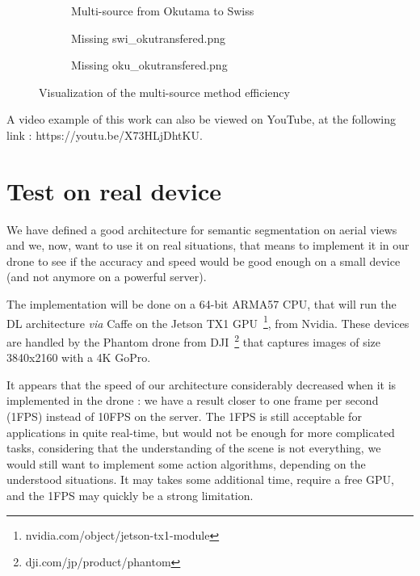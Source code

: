 \begin{figure}[ht!]
  \begin{subfigure}[c]{0.20\textwidth}
    \centering Multi-source from Okutama to Swiss
  \end{subfigure}
  \begin{subfigure}[c]{0.33\textwidth}
    \centering Missing swi\_okutransfered.png
  \end{subfigure}
  \begin{subfigure}[c]{0.45\textwidth}
    \centering Missing oku\_okutransfered.png
  \end{subfigure}
  \vspace{0.1cm}
  
  \caption{Visualization of the multi-source method efficiency}
  \label{fig:part4:visu_ms}
\end{figure}

A video example of this work can also be viewed on YouTube, at the following link : https://youtu.be/X73HLjDhtKU.



\section{Test on real device}
We have defined a good architecture for semantic segmentation on aerial views and we, now, want to use it on real situations, that means to implement it in our drone to see if the accuracy and speed would be good enough on a small device (and not anymore on a powerful server).

The implementation will be done on a 64-bit ARM\textregistered A57 CPU, that will run the DL architecture \textit{via} Caffe on the Jetson TX1 GPU~\footnote{nvidia.com/object/jetson-tx1-module}, from Nvidia. These devices are handled by the Phantom drone from DJI~\footnote{dji.com/jp/product/phantom} that captures images of size 3840x2160 with a 4K GoPro.

It appears that the speed of our architecture considerably decreased when it is implemented in the drone : we have a result closer to one frame per second (1FPS) instead of 10FPS on the server. The 1FPS is still acceptable for applications in quite real-time, but would not be enough for more complicated tasks, considering that the understanding of the scene is not everything, we would still want to implement some action algorithms, depending on the understood situations. It may takes some additional time, require a free GPU, and the 1FPS may quickly be a strong limitation.


